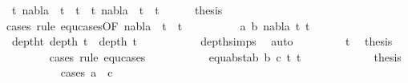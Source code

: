 \begin{isabellebody}
\ t{}{}{\isacharcolon}{\kern0pt}\ {\isachardoublequoteopen}nabla\ {\isasymturnstile}\ t{}\ {\isasymapprox}\ t{}{\isachardoublequoteclose}\ \ t{}{}{\isacharcolon}{\kern0pt}\ {\isachardoublequoteopen}nabla\ {\isasymturnstile}\ t{}\ {\isasymapprox}\ t{}{\isachardoublequoteclose}\isanewline
\ \ \ \ \isamarkupfalse%
\ {\isacharquery}{\kern0pt}thesis\isanewline
\ \ \ \ \ \isamarkupfalse%
{\isacharparenleft}{\kern0pt}cases\ rule{\isacharcolon}{\kern0pt}\ equ{\isachardot}{\kern0pt}cases{\isacharbrackleft}{\kern0pt}OF\ {\isacartoucheopen}nabla\ {\isasymturnstile}\ t{}\ {\isasymapprox}\ t{}{\isacartoucheclose}{\isacharbrackright}{\kern0pt}{\isacharparenright}{\kern0pt}\isanewline
\ \ \ \ \ \ \ \isamarkupfalse%
\ {\isacharparenleft}{\kern0pt}{}\ a\ b\ nabla\ t{}{\isacharprime}{\kern0pt}\ t{}{\isacharprime}{\kern0pt}{\isacharparenright}{\kern0pt}\isanewline
\ \ \ \ \ \ \ \isamarkupfalse%
\ {}{\isacharparenleft}{\kern0pt}{}{\isacharparenright}{\kern0pt}\ \isamarkupfalse%
\ deptht{}{\isacharcolon}{\kern0pt}\ {\isachardoublequoteopen}depth\ t{}{\isacharprime}{\kern0pt}\ {\isacharless}{\kern0pt}\ depth\ t{}{\isachardoublequoteclose}\isanewline
\ \ \ \ \ \ \ \ \ \isamarkupfalse%
\ depth{\isachardot}{\kern0pt}simps{\isacharparenleft}{\kern0pt}{}{\isacharparenright}{\kern0pt}\ \isamarkupfalse%
\ auto\isanewline
\ \ \ \ \ \ \ \isamarkupfalse%
\ t{}{}\ \isamarkupfalse%
\ {\isacharquery}{\kern0pt}thesis\isanewline
\ \ \ \ \ \ \ \isamarkupfalse%
{\isacharparenleft}{\kern0pt}cases\ rule{\isacharcolon}{\kern0pt}\ equ{\isachardot}{\kern0pt}cases{\isacharparenright}{\kern0pt}\isanewline
\ \ \ \ \ \ \ \ \ \isamarkupfalse%
\ {\isacharparenleft}{\kern0pt}equ{\isacharunderscore}{\kern0pt}abst{\isacharunderscore}{\kern0pt}ab\ b\ c\ t{}{\isacharprime}{\kern0pt}\ t{}{\isacharprime}{\kern0pt}{\isacharparenright}{\kern0pt}\isanewline
\ \ \ \ \ \ \ \ \ \isamarkupfalse%
\ \isamarkupfalse%
\ {\isacharquery}{\kern0pt}thesis\ \isanewline
\ \ \ \ \ \ \ \ \ \isamarkupfalse%
{\isacharparenleft}{\kern0pt}cases\ {\isachardoublequoteopen}a\ {\isacharequal}{\kern0pt}\ c{\isachardoublequoteclose}{\isacharparenright}{\kern0pt}\isanewline

\end{isabellebody}
